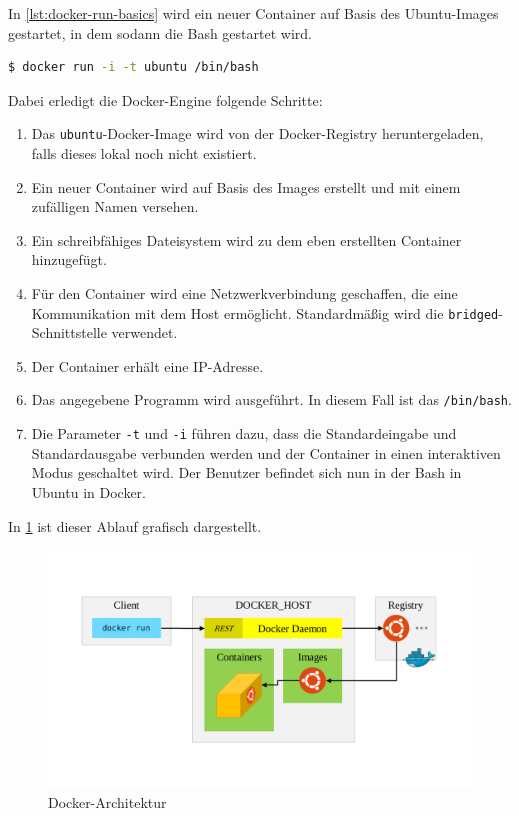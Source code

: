 In \cref{lst:docker-run-basics} wird ein neuer Container auf Basis des Ubuntu-Images gestartet, in dem sodann die Bash gestartet wird.
\begin{lstlisting}[caption=Ubuntu-Bash in Docker, language=bash, label=lst:docker-run-basics]
    $ docker run -i -t ubuntu /bin/bash
\end{lstlisting}
Dabei erledigt die Docker-Engine folgende Schritte:
\begin{enumerate}
    \item Das \texttt{ubuntu}-Docker-Image wird von der Docker-Registry heruntergeladen, falls dieses lokal noch nicht existiert.
    \item Ein neuer Container wird auf Basis des Images erstellt und mit einem zufälligen Namen versehen.
    \item Ein schreibfähiges Dateisystem wird zu dem eben erstellten Container hinzugefügt.
    \item Für den Container wird eine Netzwerkverbindung geschaffen, die eine Kommunikation mit dem Host ermöglicht. Standardmäßig wird die \texttt{bridged}-Schnittstelle verwendet.
    \item Der Container erhält eine IP-Adresse.
    \item Das angegebene Programm wird ausgeführt. In diesem Fall ist das \texttt{/bin/bash}.
    \item Die Parameter \texttt{-t} und \texttt{-i} führen dazu, dass die Standardeingabe und Standardausgabe verbunden werden und der Container in einen interaktiven Modus geschaltet wird. Der Benutzer befindet sich nun in der Bash in Ubuntu in Docker.
\end{enumerate}
In \cref{fig:docker-architektur} ist dieser Ablauf grafisch dargestellt.
\begin{figure}[htbp]
    \centering
    \includegraphics[width=0.75\linewidth,clip,trim=70 100 70 80]{images/docker-architecture}
    \caption{Docker-Architektur}
\label{fig:docker-architektur}
\end{figure}


